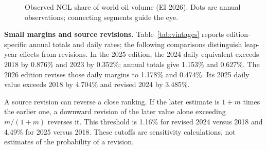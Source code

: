 \documentclass[reprint,aps,pra,longbibliography,floatfix]{revtex4-2}
\begin{document}
\begin{figure}[!t]\centering
{}
\caption{Observed NGL share of world oil volume (EI 2026). Dots are annual observations; connecting segments guide the eye.}\label{fig:composition}
\end{figure}

\textbf{Small margins and source revisions.}\quad
Table~\ref{tab:vintages} reports edition-specific annual totals and daily rates; the following comparisons distinguish leap-year effects from revisions. In the 2025 edition, the 2024 daily equivalent exceeds 2018 by 0.876\% and 2023 by 0.352\%; annual totals give 1.153\% and 0.627\%. The 2026 edition revises those daily margins to 1.178\% and 0.474\%. Its 2025 daily value exceeds 2018 by 4.704\% and revised 2024 by 3.485\%.

A source revision can reverse a close ranking. If the later estimate is $1+m$ times the earlier one, a downward revision of the later value alone exceeding $m/(1+m)$ reverses it. This threshold is 1.16\% for revised 2024 versus 2018 and 4.49\% for 2025 versus 2018. These cutoffs are sensitivity calculations, not estimates of the probability of a revision.
\end{document}
